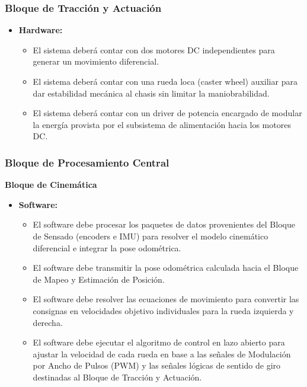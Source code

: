 \subsubsection{Bloque de Tracción y Actuación}
\begin{itemize}
    \item \textbf{Hardware:}
    \begin{itemize}
        \item El sistema deberá contar con dos motores DC independientes para generar un movimiento diferencial.
        \item El sistema deberá contar con una rueda loca (caster wheel) auxiliar para dar estabilidad mecánica al chasis sin limitar la maniobrabilidad.
        \item El sistema deberá contar con un driver de potencia encargado de modular la energía provista por el subsistema de alimentación hacia los motores DC.
    \end{itemize}
\end{itemize}

\subsubsection{Bloque de Procesamiento Central}
\noindent\textbf{Bloque de Cinemática}
\begin{itemize}
    \item \textbf{Software:}
    \begin{itemize}
        \item El software debe procesar los paquetes de datos provenientes del Bloque de Sensado (encoders e IMU) para resolver el modelo cinemático diferencial e integrar la pose odométrica.
        \item El software debe transmitir la pose odométrica calculada hacia el Bloque de Mapeo y Estimación de Posición.
        \item El software debe resolver las ecuaciones de movimiento para convertir las consignas en velocidades objetivo individuales para la rueda izquierda y derecha.
        \item El software debe ejecutar el algoritmo de control en lazo abierto para ajustar la velocidad de cada rueda en base a las señales de Modulación por Ancho de Pulsos (PWM) y las señales lógicas de sentido de giro destinadas al Bloque de Tracción y Actuación.
    \end{itemize}
\end{itemize}

